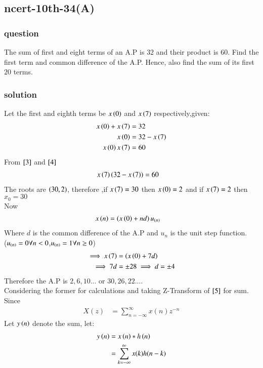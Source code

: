 \documentclass[journal,12pt,onecolumn]{IEEEtran}
\theoremstyle{remark}
\begin{document}
\subsection{ncert-10th-34(A)}
\subsubsection{question}
The sum of first and eight terms of an A.P is $32$ and their product is $60$. Find the first term and common difference of the A.P. Hence, also find the sum of its first $20$ terms.  
\subsubsection{solution}
Let the first and eighth terms be $x\left(0\right)$ and $x\left(7\right)$ respectively,given:
\begin{align}
x\left(0\right)+x\left(7\right) &= 32\\
x\left(0\right) &= 32 - x\left(7\right)\label{3} \\
x\left(0\right)x\left(7\right) &= 60 \label{4}
\end{align}
From $\eqref{3}$ and $\eqref{4}$
\begin{align}
    x\left(7\right)\left(32-x\left(7\right)\right) &= 60
\end{align}
The roots are $\left(30,2\right)$, therefore ,if $x\left(7\right)=30$ then $x\left(0\right)=2$ and if $x\left(7\right)=2$ then $x_0=30$\\
Now
\begin{align}
    x\left(n\right) &= \left(x\left(0\right) + nd\right)u_{\left(n\right)}\label{5}
    \end{align}
    Where $d$ is the common difference of the A.P and $u_n$ is the unit step function.\\($u_{\left(n\right)}=0 \forall n<0$,$u_{\left(n\right)}=1 \forall n\geq0$)
    \begin{align}
        \implies     x\left(7\right) &= \left(x\left(0\right) + 7d\right)\\
    \implies 7d &= \pm 28 \implies d = \pm 4
\end{align}
Therefore the A.P is $2,6,10...$ or $30,26,22...$.\\
Considering the former for calculations and taking Z-Transform of $\eqref{5}$ for sum.\\
Since
\begin{align}
X(z) &= \sum_{n=-\infty}^{\infty} x(n)z^{-n} \label{6}
\end{align}
Let $y\left(n\right)$ denote the sum, let:
\begin{align}
    y\left(n\right) &= x\left(n\right) * h\left(n\right)\\
    &= \sum_{k=-\infty}^{\infty} x(k)h(n-k)
\end{align}
\end{document}
